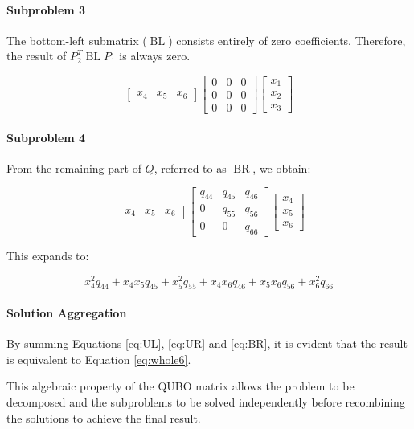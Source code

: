 \paragraph{Subproblem 3} The bottom-left submatrix ($\operatorname{BL}$) consists entirely of zero coefficients. 
Therefore, the result of $P_2^T\operatorname{BL}P_1$ is always zero.

\begin{equation*}
    \begin{bmatrix}
        x_4 & x_5 & x_6
    \end{bmatrix}
    \begin{bmatrix}
        0 & 0 & 0 \\
        0 & 0 & 0 \\
        0 & 0 & 0
    \end{bmatrix}
    \begin{bmatrix}
        x_1 \\
        x_2 \\
        x_3
    \end{bmatrix}
\end{equation*}

\paragraph{Subproblem 4} From the remaining part of $Q$, referred to as $\operatorname{BR}$, we obtain:

\begin{equation*}
    \begin{bmatrix}
        x_4 & x_5 & x_6
    \end{bmatrix}
    \begin{bmatrix}
        q_{44} & q_{45} & q_{46} \\
        0 & q_{55} & q_{56} \\
        0 & 0 & q_{66}
    \end{bmatrix}
    \begin{bmatrix}
        x_4 \\
        x_5 \\
        x_6
    \end{bmatrix}
\end{equation*}

This expands to:

\begin{equation}
 x_4^2q_{44} + x_4x_5q_{45} + x_5^2q_{55} + x_4x_6q_{46} + x_5x_6q_{56} + x_6^2q_{66}
    \label{eq:BR}
\end{equation}

\paragraph{Solution Aggregation} By summing Equations \eqref{eq:UL}, \eqref{eq:UR} and \eqref{eq:BR}, it is evident that the result is equivalent to Equation \eqref{eq:whole6}.

This algebraic property of the QUBO matrix allows the problem to be decomposed and the subproblems to be solved independently before recombining the solutions to achieve the final result.
